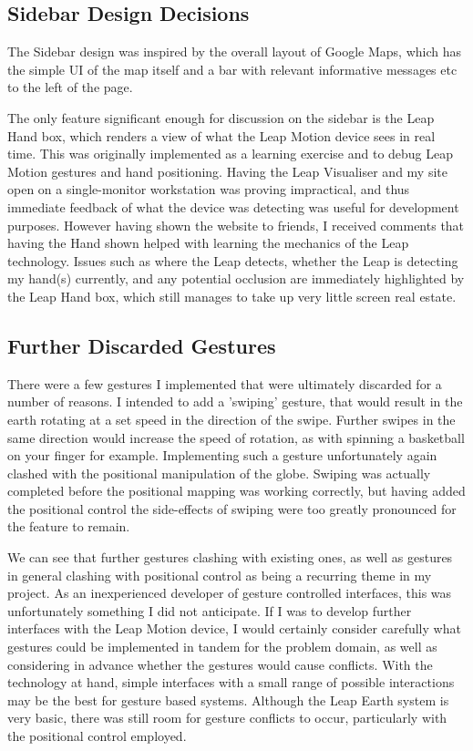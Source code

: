 \documentclass{sigplanconf}
\begin{document}
\subsection{Sidebar Design Decisions}

The Sidebar design was inspired by the overall layout of Google Maps, which has the simple UI of the map itself and a bar with relevant informative messages etc to the left of the page. 

The only feature significant enough for discussion on the sidebar is the Leap Hand box, which renders a view of what the Leap Motion device sees in real time. This was originally implemented as a learning exercise and to debug Leap Motion gestures and hand positioning. Having the Leap Visualiser and my site open on a single-monitor workstation was proving impractical, and thus immediate feedback of what the device was detecting was useful for development purposes. However having shown the website to friends, I received comments that having the Hand shown helped with learning the mechanics of the Leap technology. Issues such as where the Leap detects, whether the Leap is detecting my hand(s) currently, and any potential occlusion are immediately highlighted by the Leap Hand box, which still manages to take up very little screen real estate. 

\subsection{Further Discarded Gestures}

There were a few gestures I implemented that were ultimately discarded for a number of reasons. I intended to add a 'swiping' gesture, that would result in the earth rotating at a set speed in the direction of the swipe. Further swipes in the same direction would increase the speed of rotation, as with spinning a basketball on your finger for example. Implementing such a gesture unfortunately again clashed with the positional manipulation of the globe. Swiping was actually completed before the positional mapping was working correctly, but having added the positional control the side-effects of swiping were too greatly pronounced for the feature to remain.

We can see that further gestures clashing with existing ones, as well as gestures in general clashing with positional control as being a recurring theme in my project. As an inexperienced developer of gesture controlled interfaces, this was unfortunately something I did not anticipate. If I was to develop further interfaces with the Leap Motion device, I would certainly consider carefully what gestures could be implemented in tandem for the problem domain, as well as considering in advance whether the gestures would cause conflicts. With the technology at hand, simple interfaces with a small range of possible interactions may be the best for gesture based systems. Although the Leap Earth system is very basic, there was still room for gesture conflicts to occur, particularly with the positional control employed.
\end{document}
